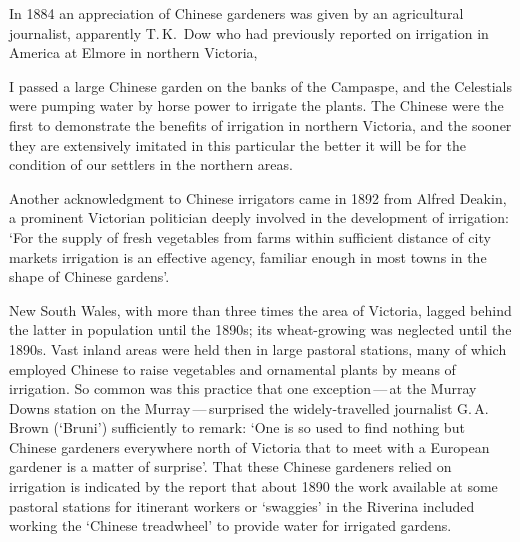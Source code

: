 In 1884 an appreciation of Chinese gardeners was given by an
agricultural journalist, apparently T.\,K.~Dow  who
had previously reported on irrigation in America at
Elmore  in northern Victoria,
\begin{Quote}
	I passed a large Chinese garden on the banks of the Campaspe,
	and the Celestials were
	pumping water by
	horse power to irrigate the plants.  The Chinese
	were the first to demonstrate the benefits of irrigation in
	northern Victoria, and the sooner they are extensively
	imitated in this particular the better it will be for the
	condition of our settlers in the northern
	areas.
\end{Quote}

Another acknowledgment to Chinese irrigators came in 1892 from Alfred
Deakin,  a prominent Victorian politician deeply
involved in the development of irrigation: `For the supply of fresh
vegetables from farms within sufficient distance of city markets
irrigation is an effective agency, familiar enough in most towns in
the shape of Chinese gardens'.

New South Wales,  with more than three times
the area of Victoria, lagged behind the latter in population until the
1890s; its wheat-growing was neglected until the 1890s.
Vast inland areas were held then in large pastoral stations, many of
which employed Chinese  to raise vegetables and
ornamental plants by means of irrigation.  So common was this practice
that one exception\,---\,at the Murray Downs station
 on the Murray\,---\,surprised
 the widely-travelled journalist G.\,A. Brown
(`Bruni')  sufficiently to remark: `One is so
used to find nothing but Chinese gardeners everywhere north of
Victoria that to meet with a European gardener is a
matter of surprise'.  That these Chinese gardeners relied on
irrigation is indicated by the report that about 1890 the work
available at some pastoral stations for itinerant workers or
`swaggies' in the Riverina  included working the
`Chinese treadwheel' to provide water for irrigated
gardens.

